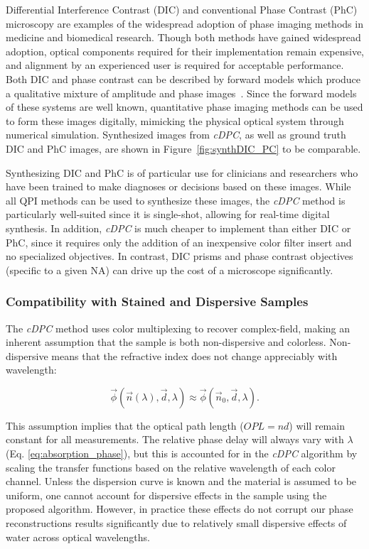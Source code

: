 Differential Interference Contrast (DIC) and conventional Phase Contrast (PhC) microscopy are examples of the widespread adoption of phase imaging methods in medicine and biomedical research. Though both methods have gained widespread adoption, optical components required for their implementation remain expensive, and alignment by an experienced user is required for acceptable performance. Both DIC and phase contrast can be described by forward models which produce a qualitative mixture of amplitude and phase images~\cite{zernike1942phase, smithDIC}. Since the forward models of these systems are well known, quantitative phase imaging methods can be used to form these images digitally, mimicking the physical optical system through numerical simulation. Synthesized images from \textit{cDPC}, as well as ground truth DIC and PhC images, are shown in Figure~\ref{fig:synthDIC_PC} to be comparable.

Synthesizing DIC and PhC is of particular use for clinicians and researchers who have been trained to make diagnoses or decisions based on these images. While all QPI methods can be used to synthesize these images, the \textit{cDPC} method is particularly well-suited since it is single-shot, allowing for real-time digital synthesis. In addition, \textit{cDPC} is much cheaper to implement than either DIC or PhC, since it requires only the addition of an inexpensive color filter insert and no specialized objectives. In contrast, DIC prisms and phase contrast objectives (specific to a given NA) can drive up the cost of a microscope significantly.

\subsubsection{Compatibility with Stained and Dispersive Samples}
The \textit{cDPC} method uses color multiplexing to recover complex-field, making an inherent assumption that the sample is both non-dispersive and colorless. Non-dispersive means that the refractive index does not change appreciably with wavelength:

\begin{equation} \label{Eq:nonDispersive}
\vec{\phi}(\vec{n}(\lambda),\vec{d},\lambda) \approx \vec{\phi}(\vec{n}_0,\vec{d},\lambda).
\end{equation}

\noindent This assumption implies that the optical path length ($OPL = nd$) will remain constant for all measurements. The relative phase delay will always vary with $\lambda$ (Eq. \ref{eq:absorption_phase}), but this is accounted for in the \textit{cDPC} algorithm by scaling the transfer functions based on the relative wavelength of each color channel. Unless the dispersion curve is known and the material is assumed to be uniform, one cannot account for dispersive effects in the sample using the proposed algorithm. However, in practice these effects do not corrupt our phase reconstructions results significantly due to relatively small dispersive effects of water across optical wavelengths.

